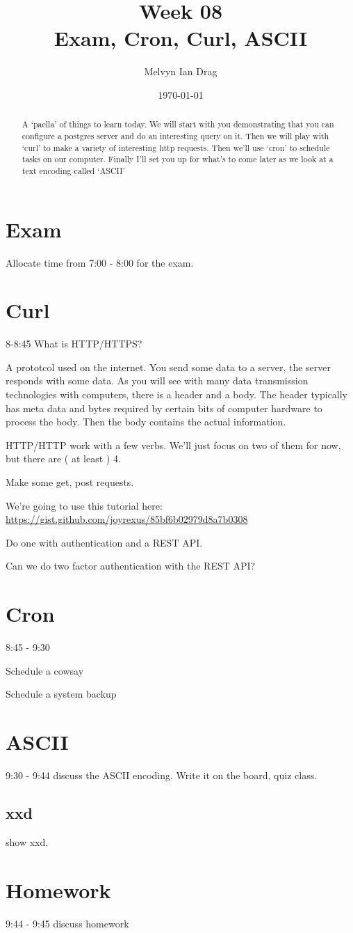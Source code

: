 \documentclass[12pt]{article}
\title{\textbf{Week 08} \\
\Large Exam, Cron, Curl, ASCII}
\author{
	Melvyn Ian Drag
}
\date{\today}
\begin{document}
\maketitle

\begin{abstract}
A `paella' of things to learn today. We will start with you demonstrating that you can configure a postgres server and do an interesting query on it. Then we will play with `curl' to make a variety of interesting http requests. Then we'll use `cron' to schedule tasks on our computer. Finally I'll set you up for what's to come later as we look at a text encoding called `ASCII'
\end{abstract}


\section{Exam}
Allocate time from 7:00 - 8:00 for the exam.

\section{Curl}
8-8:45
What is HTTP/HTTPS?

A prototcol used on the internet. You send some data to a server, the server responds with some data. As you will see with many data transmission technologies with computers, there is a header and a body. The header typically has meta data and bytes required by certain bits of computer hardware to process the body. Then the body contains the actual information.

HTTP/HTTP work with a few verbs. We'll just focus on two of them for now, but there are ( at least ) 4. 

Make some get, post requests. 

We're going to use this tutorial here:
\url{https://gist.github.com/joyrexus/85bf6b02979d8a7b0308}

Do one with authentication and a REST API.

Can we do two factor authentication with the REST API?

\section{Cron}
8:45 - 9:30

Schedule a cowsay

Schedule a system backup

\section{ASCII}
9:30 - 9:44 discuss the ASCII encoding.
Write it on the board, quiz class.

\subsection{xxd}
show xxd.

\section{Homework}
9:44 - 9:45 discuss homework
\end{document}
